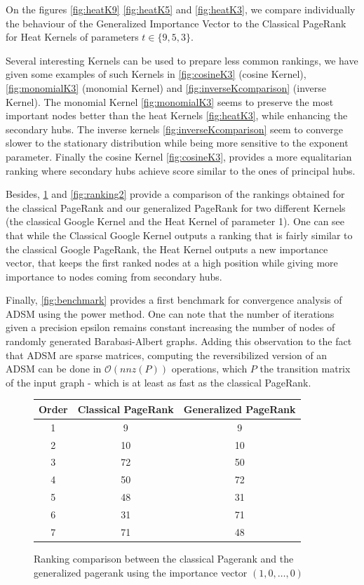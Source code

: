 \documentclass[sn-mathphys]{sn-jnl}%
\theoremstyle{thmstyleone}%
\theoremstyle{thmstyletwo}%
\theoremstyle{thmstylethree}%
\begin{document}
On the figures \ref{fig:heatK9} \ref{fig:heatK5} and \ref{fig:heatK3},
we compare individually the behaviour of the Generalized Importance
Vector to the Classical PageRank for Heat Kernels of parameters
$t \in \{9, 5, 3\}$.

Several interesting Kernels can be used to prepare less common
rankings, we have given some examples of such Kernels in
\ref{fig:cosineK3} (cosine Kernel), \ref{fig:monomialK3} (monomial
Kernel) and \ref{fig:inverseKcomparison} (inverse Kernel). The
monomial Kernel \ref{fig:monomialK3} seems to preserve the most
important nodes better than the heat Kernels \ref{fig:heatK3}, while
enhancing the secondary hubs. The inverse kernels
\ref{fig:inverseKcomparison} seem to converge slower to the stationary
distribution while being more sensitive to the exponent
parameter. Finally the cosine Kernel \ref{fig:cosineK3}, provides a
more equalitarian ranking where secondary hubs achieve score similar
to the ones of principal hubs.

Besides, \ref{fig:ranking1} and \ref{fig:ranking2} provide a
comparison of the rankings obtained for the classical PageRank and our
generalized PageRank for two different Kernels (the classical Google
Kernel and the Heat Kernel of parameter 1). One can see that while the
Classical Google Kernel outputs a ranking that is fairly similar to
the classical Google PageRank, the Heat Kernel outputs a new
importance vector, that keeps the first ranked nodes at a high
position while giving more importance to nodes coming from secondary
hubs.

Finally, \ref{fig:benchmark} provides a first benchmark for
convergence analysis of ADSM using the power method. One can note that
the number of iterations given a precision epsilon remains constant
increasing the number of nodes of randomly generated Barabasi-Albert
graphs. Adding this observation to the fact that ADSM are sparse
matrices, computing the reversibilized version of an ADSM can be done
in $\mathcal{O}(nnz(P))$ operations, which $P$ the transition matrix
of the input graph - which is at least as fast as the classical
PageRank.


\begin{figure}[H]
\centering
\begin{tabular}{c|c|c}
    \textbf{Order} & \textbf{Classical PageRank} & \textbf{Generalized PageRank} \\
    \hline
    1 & 9 & 9 \\
    2 & 10 & 10\\
    3 & 72 & 50\\
    4 & 50 & 72\\
    5 & 48 & 31 \\
    6 & 31 & 71\\
    7 & 71 & 48\\
    \hline
    
\end{tabular}

    \caption{Ranking comparison between the classical Pagerank and the generalized pagerank using the importance vector $(1, 0, \hdots, 0)$}
    \label{fig:ranking1}
\end{figure}
\end{document}
